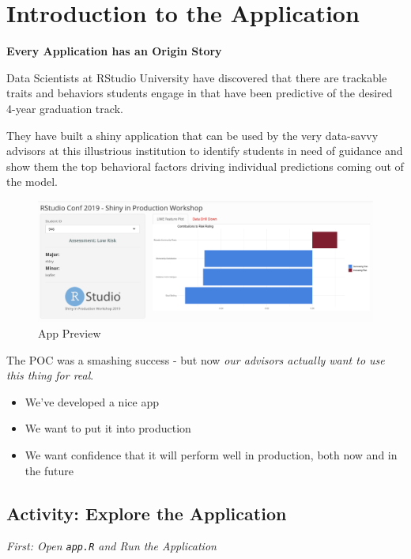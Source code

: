\documentclass[]{book}
\providecommand{\tightlist}{%
  \setlength{\itemsep}{0pt}\setlength{\parskip}{0pt}}
\theoremstyle{definition}
\theoremstyle{definition}
\theoremstyle{definition}
\theoremstyle{remark}
\begin{document}
\hypertarget{app-intro}{%
\chapter{Introduction to the Application}\label{app-intro}}

\textbf{Every Application has an Origin Story}

Data Scientists at RStudio University have discovered that there are
trackable traits and behaviors students engage in that have been
predictive of the desired 4-year graduation track.

They have built a shiny application that can be used by the very
data-savvy advisors at this illustrious institution to identify students
in need of guidance and show them the top behavioral factors driving
individual predictions coming out of the model.

\begin{figure}
\centering
\includegraphics{imgs/app-intro/app-screenshot.png}
\caption{App Preview}
\end{figure}

The POC was a smashing success - but now \emph{our advisors actually
want to use this thing for real}.

\begin{itemize}
\tightlist
\item
  We've developed a nice app
\item
  We want to put it into production
\item
  We want confidence that it will perform well in production, both now
  and in the future
\end{itemize}

\hypertarget{activity-explore-the-application}{%
\section{Activity: Explore the
Application}\label{activity-explore-the-application}}

\emph{First: Open \texttt{app.R} and Run the Application}
\end{document}
